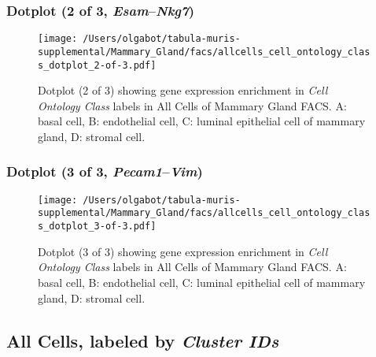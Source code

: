 \clearpage

\subsubsection{Dotplot (2 of 3, \emph{Esam}--\emph{Nkg7})}
\begin{figure}[h]
\centering
\texttt{[image: /Users/olgabot/tabula-muris-supplemental/Mammary\_Gland/facs/allcells\_cell\_ontology\_class\_dotplot\_2-of-3.pdf]}

\caption{ Dotplot (2 of 3)  showing gene expression enrichment in \emph{Cell Ontology Class} labels in All Cells of Mammary Gland FACS. A: basal cell, B: endothelial cell, C: luminal epithelial cell of mammary gland, D: stromal cell.}
\end{figure}


\clearpage

\subsubsection{Dotplot (3 of 3, \emph{Pecam1}--\emph{Vim})}
\begin{figure}[h]
\centering
\texttt{[image: /Users/olgabot/tabula-muris-supplemental/Mammary\_Gland/facs/allcells\_cell\_ontology\_class\_dotplot\_3-of-3.pdf]}

\caption{ Dotplot (3 of 3)  showing gene expression enrichment in \emph{Cell Ontology Class} labels in All Cells of Mammary Gland FACS. A: basal cell, B: endothelial cell, C: luminal epithelial cell of mammary gland, D: stromal cell.}
\end{figure}


\clearpage

\subsection{All Cells, labeled by \emph{Cluster IDs}}
